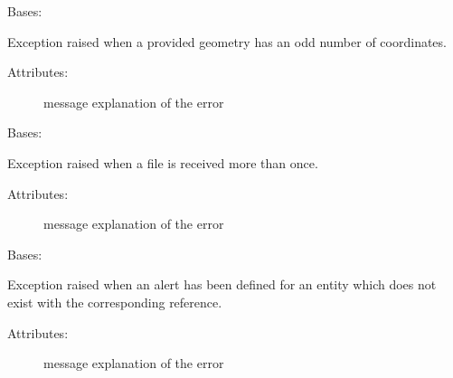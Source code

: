 
\begin{fulllineitems}
\label{\detokenize{eboa.engine:eboa.engine.errors.OddNumberOfCoordinates}}
Bases: {\hyperref[\detokenize{eboa.engine:eboa.engine.errors.Error}]{}}

Exception raised when a provided geometry has an odd number of coordinates.
\begin{description}
\item[{Attributes:}] \leavevmode
message \textendash{} explanation of the error

\end{description}

\end{fulllineitems}


\begin{fulllineitems}
\label{\detokenize{eboa.engine:eboa.engine.errors.SourceAlreadyIngested}}
Bases: {\hyperref[\detokenize{eboa.engine:eboa.engine.errors.Error}]{}}

Exception raised when a file is received more than once.
\begin{description}
\item[{Attributes:}] \leavevmode
message \textendash{} explanation of the error

\end{description}

\end{fulllineitems}


\begin{fulllineitems}
\label{\detokenize{eboa.engine:eboa.engine.errors.UndefinedEntityReference}}
Bases: {\hyperref[\detokenize{eboa.engine:eboa.engine.errors.Error}]{}}

Exception raised when an alert has been defined for an entity which does not exist with the corresponding reference.
\begin{description}
\item[{Attributes:}] \leavevmode
message \textendash{} explanation of the error

\end{description}

\end{fulllineitems}

